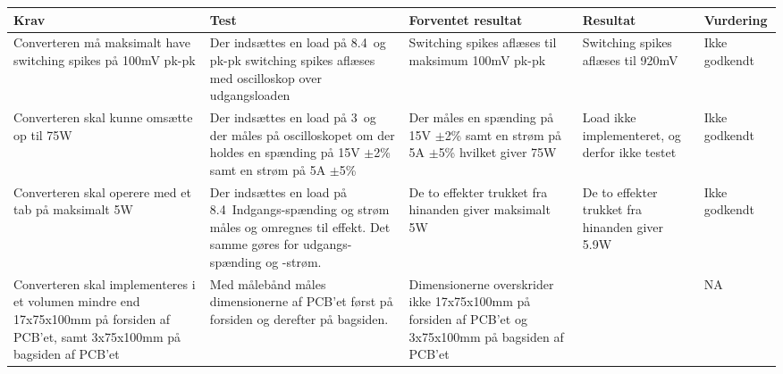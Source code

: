 \begin{tabularx}{\textwidth}{|X|X|X|X|X|}
	\hline
	\textbf{Krav} & \textbf{Test} & \textbf{Forventet resultat} & \textbf{Resultat} & \textbf{Vurdering} \\ \hline
	Converteren må maksimalt have switching spikes på 100mV pk-pk & Der indsættes en load på 8.4\ohm\ og pk-pk switching spikes aflæses med oscilloskop over udgangsloaden & Switching spikes aflæses til maksimum 100mV pk-pk & Switching spikes aflæses til 920mV & Ikke godkendt \\ \hline
	Converteren skal kunne omsætte op til 75W & Der indsættes en load på 3\ohm\ og der måles på oscilloskopet om der holdes en spænding på 15V $\pm$2\% samt en strøm på 5A $\pm$5\% & Der måles en spænding på 15V $\pm$2\% samt en strøm på 5A $\pm$5\% hvilket giver 75W & Load ikke implementeret, og derfor ikke testet & Ikke godkendt \\ \hline
	Converteren skal operere med et tab på maksimalt 5W & Der indsættes en load på 8.4\ohm\ Indgangs-spænding og strøm måles og omregnes til effekt. Det samme gøres for udgangs-spænding og -strøm. & De to effekter trukket fra hinanden giver maksimalt 5W & De to effekter trukket fra hinanden giver 5.9W & Ikke godkendt \\ \hline 
	Converteren skal implementeres i et volumen mindre end 17x75x100mm på forsiden af PCB'et, samt 3x75x100mm på bagsiden af PCB'et & Med målebånd måles dimensionerne af PCB'et først på forsiden og derefter på bagsiden. & Dimensionerne overskrider ikke 17x75x100mm på forsiden af PCB'et og 3x75x100mm på bagsiden af PCB'et && NA \\ \hline
	
\end{tabularx}



